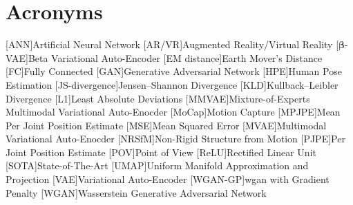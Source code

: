 \chapter*{Acronyms}

\begin{acronym}[TBD]
    [ANN]{Artificial Neural Network}
    [AR/VR]{Augmented Reality/Virtual Reality}
    [$\boldsymbol{\beta}$-VAE]{Beta Variational Auto-Encoder}
    [EM distance]{Earth Mover's Distance}
    [FC]{Fully Connected}
    [GAN]{Generative Adversarial Network}
    [HPE]{Human Pose Estimation}
    [JS-divergence]{Jensen–Shannon Divergence}
    [KLD]{Kullback–Leibler Divergence}
    [L1]{Least Absolute Deviations}
    [MMVAE]{Mixture-of-Experts Multimodal Variational Auto-Enocder}
    [MoCap]{Motion Capture}
    [MPJPE]{Mean Per Joint Position Estimate}
    [MSE]{Mean Squared Error}
    [MVAE]{Multimodal Variational Auto-Enocder}
    [NRSfM]{Non-Rigid Structure from Motion}
    [PJPE]{Per Joint Position Estimate}
    [POV]{Point of View}
    [ReLU]{Rectified Linear Unit}
    [SOTA]{State-of-The-Art}
    [UMAP]{Uniform Manifold Approximation and Projection}
    [VAE]{Variational Auto-Encoder}
    [WGAN-GP]{\ac{wgan} with Gradient Penalty}
    [WGAN]{Wasserstein Generative Adversarial Network}
\end{acronym}

